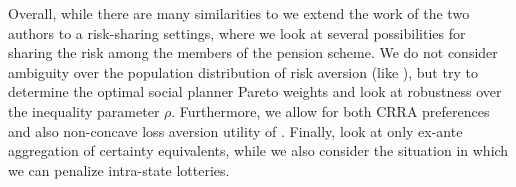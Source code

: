 Overall, while there are many similarities to \citet{BalterSchweizer2024} we extend the work of the two authors to a risk-sharing settings, where we look at several possibilities for sharing the risk among the members of the pension scheme. We do not consider ambiguity over the population distribution of risk aversion (like \citet{BalterSchweizer2024}), but try to determine the optimal social planner Pareto weights and look at robustness over the inequality parameter $\rho$. Furthermore, we allow for both CRRA preferences and also non-concave loss aversion utility of \citet{KahnemanTversky1979}. Finally, \citet{BalterSchweizer2024} look at only ex-ante aggregation of certainty equivalents, while we also consider the situation in which we can penalize intra-state lotteries.
